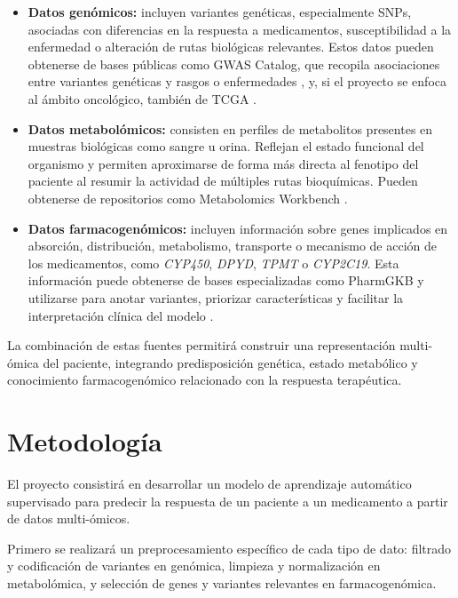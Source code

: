 \documentclass[11pt]{article}
\begin{document}
\begin{itemize}

\item \textbf{Datos genómicos:} incluyen variantes genéticas, especialmente SNPs, asociadas con diferencias en la respuesta a medicamentos, susceptibilidad a la enfermedad o alteración de rutas biológicas relevantes. Estos datos pueden obtenerse de bases públicas como GWAS Catalog, que recopila asociaciones entre variantes genéticas y rasgos o enfermedades \cite{gwas_catalog}, y, si el proyecto se enfoca al ámbito oncológico, también de TCGA \cite{tcga_pancancer}.

\item \textbf{Datos metabolómicos:} consisten en perfiles de metabolitos presentes en muestras biológicas como sangre u orina. Reflejan el estado funcional del organismo y permiten aproximarse de forma más directa al fenotipo del paciente al resumir la actividad de múltiples rutas bioquímicas. Pueden obtenerse de repositorios como Metabolomics Workbench \cite{metabolomics_workbench}.

\item \textbf{Datos farmacogenómicos:} incluyen información sobre genes implicados en absorción, distribución, metabolismo, transporte o mecanismo de acción de los medicamentos, como \textit{CYP450}, \textit{DPYD}, \textit{TPMT} o \textit{CYP2C19}. Esta información puede obtenerse de bases especializadas como PharmGKB y utilizarse para anotar variantes, priorizar características y facilitar la interpretación clínica del modelo \cite{pharmgkb_resource}.

\end{itemize}

La combinación de estas fuentes permitirá construir una representación multi-ómica del paciente, integrando predisposición genética, estado metabólico y conocimiento farmacogenómico relacionado con la respuesta terapéutica.

\section{Metodología}

El proyecto consistirá en desarrollar un modelo de aprendizaje automático supervisado para predecir la respuesta de un paciente a un medicamento a partir de datos multi-ómicos.

Primero se realizará un preprocesamiento específico de cada tipo de dato: filtrado y codificación de variantes en genómica, limpieza y normalización en metabolómica, y selección de genes y variantes relevantes en farmacogenómica.
\end{document}
